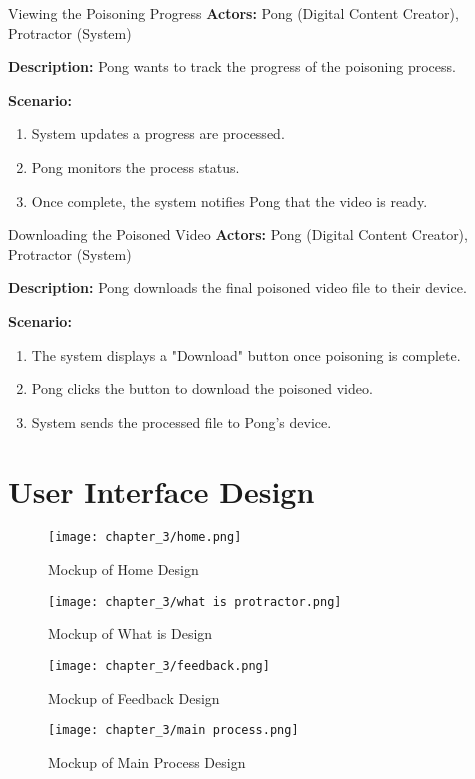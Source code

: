 \begin{usecase}{Viewing the Poisoning Progress}
    \textbf{Actors:} Pong (Digital Content Creator), Protractor (System)

    \textbf{Description:} Pong wants to track the progress of the poisoning process.

    \textbf{Scenario:}
    \begin{enumerate}[leftmargin=80pt]
        \item System updates a progress are processed.
        \item Pong monitors the process status.
        \item Once complete, the system notifies Pong that the video is ready.
    \end{enumerate}
\end{usecase}

\begin{usecase}{Downloading the Poisoned Video}
    \textbf{Actors:} Pong (Digital Content Creator), Protractor (System)

    \textbf{Description:} Pong downloads the final poisoned video file to their device.

    \textbf{Scenario:}
    \begin{enumerate}[leftmargin=80pt]
        \item The system displays a "Download" button once poisoning is complete.
        \item Pong clicks the button to download the poisoned video.
        \item System sends the processed file to Pong’s device.
    \end{enumerate}
\end{usecase}


\section{User Interface Design}
\label{section:user-interface-design}

\begin{figure}[h]
    \centering
    \texttt{[image: chapter\_3/home.png]}
    \caption{Mockup of Home Design}
\end{figure}

\begin{figure}[h]
    \centering
    \texttt{[image: chapter\_3/what is protractor.png]}
    \caption{Mockup of What is Design}
\end{figure}

\begin{figure}[h]
    \centering
    \texttt{[image: chapter\_3/feedback.png]}
    \caption{Mockup of Feedback Design}
\end{figure}

\begin{figure}[h]
    \centering
    \texttt{[image: chapter\_3/main process.png]}
    \caption{Mockup of Main Process Design}
\end{figure}